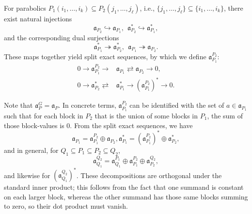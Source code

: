 \documentclass[11pt]{amsart}
\numberwithin{theorem}{section}
\numberwithin{equation}{section}
\theoremstyle{remark}
\theoremstyle{definition}
\newcommand{\ga}{\mathfrak{a}}
\begin{document}
For parabolics $P_1(i_1,\dots, i_k) \subseteq P_2(j_1,\dots, j_\ell)$, i.e., $\{j_1,\dots, j_\ell\}\subseteq \{i_1,\dots, i_k\}$, there exist natural injections
\begin{equation*}
\ga_{P_2} \hookrightarrow \ga_{P_1},\ \ \ga_{P_2}^* \hookrightarrow \ga_{P_1}^*, 
\end{equation*}
and the corresponding dual surjections
\begin{equation*}
\ga_{P_1}^* \twoheadrightarrow \ga_{P_2}^*,\ \ \ga_{P_1} \twoheadrightarrow \ga_{P_2}.
\end{equation*}
These maps together yield split exact sequences, by which we define $\ga_{P_1}^{P_2}$:
\begin{align*}
0 \rightarrow \ga_{P_1}^{P_2} \rightarrow &\ga_{P_1} \rightleftarrows \ga_{P_2} \rightarrow 0, \\
0 \rightarrow \ga_{P_2}^* \rightleftarrows &\ga_{P_1}^* \rightarrow (\ga_{P_1}^{P_2})^* \rightarrow 0.
\end{align*}

 Note that $\ga_{P}^{G}=\ga_{P}$. In concrete terms, $\ga_{P_1}^{P_2}$ can be identified with the set of $a\in\ga_{P_1}$ such that for each block in $P_2$ that is the union of some blocks in $P_1$, the sum of those block-values is $0$.
From the split exact sequences, we have
\begin{equation*}
\ga_{P_1} = \ga_{P_1}^{P_2}\oplus\ga_{P_2}  , \ga_{P_1}^* = (\ga_{P_1}^{P_2})^*\oplus \ga_{P_2}^* ,
\end{equation*}
and in general, for $Q_1 \subseteq P_1 \subseteq P_2 \subseteq Q_2$,
\begin{equation} \label{eq:a_decomp}
\ga_{Q_1}^{Q_2} = \ga_{Q_1}^{P_1} \oplus \ga_{P_1}^{P_2} \oplus \ga_{P_2}^{Q_2},
\end{equation}
and likewise for $(\ga_{Q_1}^{Q_2})^*$.
 These decompositions are orthogonal under the standard inner product; this follows from the fact that one summand is  constant on each larger block, whereas the other summand has those same blocks summing to zero, so their dot product must vanish.
\end{document}
